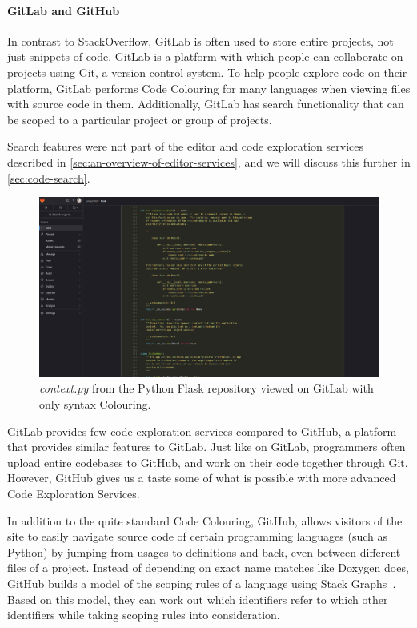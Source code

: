 \paragraph{GitLab and GitHub}

In contrast to StackOverflow, GitLab is often used to store entire projects, not just snippets of code.
GitLab is a platform with which people can collaborate on projects using Git, a version control system.
To help people explore code on their platform, GitLab performs Code Colouring for many languages when viewing files with source code in them.
Additionally, GitLab has search functionality that can be scoped to a particular project or group of projects.

Search features were not part of the editor and code exploration services described in \cref{sec:an-overview-of-editor-services}, and we will discuss this further in \cref{sec:code-search}.

\begin{figure}[!h]
    \centering
    \includegraphics[width=\textwidth]{../images/flask-gitlab}
    \caption{\textit{context.py} from the Python Flask repository viewed on GitLab with only syntax Colouring.}
    \label{fig:flask-on-gitlab}
\end{figure}


GitLab provides few code exploration services compared to GitHub, a platform that provides similar features to GitLab.
Just like on GitLab, programmers often upload entire codebases to GitHub, and work on their code together through Git.
However, GitHub gives us a taste some of what is possible with more advanced Code Exploration Services.

In addition to the quite standard Code Colouring, GitHub, allows visitors of the site to easily navigate source code of
certain programming languages (such as Python) by jumping from usages to definitions and back, even between different files of a project.
Instead of depending on exact name matches like Doxygen does, GitHub builds a model of the scoping rules of a language using Stack Graphs~\autocite{CreagerA23, stackgraphs}.
Based on this model, they can work out which identifiers refer to which other identifiers while taking scoping rules into consideration.

